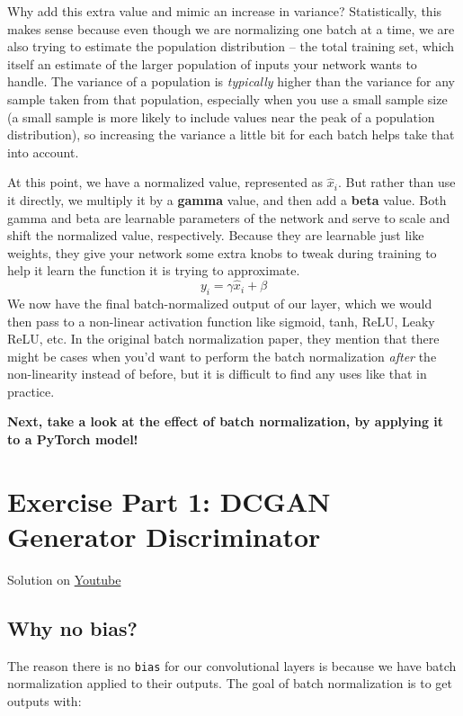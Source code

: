 Why add this extra value and mimic an increase in variance? Statistically, this makes sense because even though we are normalizing one batch at a time, we are also trying to estimate the population distribution – the total training set, which itself an estimate of the larger population of inputs your network wants to handle. The variance of a population is \textit{typically} higher than the variance for any sample taken from that population, especially when you use a small sample size (a small sample is more likely to include values near the peak of a population distribution), so increasing the variance a little bit for each batch helps take that into account. \newline

At this point, we have a normalized value, represented as \(\hat{x}_i\). But rather than use it directly, we multiply it by a \textbf{gamma} value, and then add a \textbf{beta} value. Both gamma and beta are learnable parameters of the network and serve to scale and shift the normalized value, respectively. Because they are learnable just like weights, they give your network some extra knobs to tweak during training to help it learn the function it is trying to approximate. \[y_i = \gamma \hat{x}_i + \beta\]
We now have the final batch-normalized output of our layer, which we would then pass to a non-linear activation function like sigmoid, tanh, ReLU, Leaky ReLU, etc. In the original batch normalization paper, they mention that there might be cases when you'd want to perform the batch normalization \textit{after} the non-linearity instead of before, but it is difficult to find any uses like that in practice. \newline

\textbf{Next, take a look at the effect of batch normalization, by applying it to a PyTorch model!}

\section{Exercise Part 1: DCGAN Generator Discriminator}


Solution on \href{https://www.youtube.com/watch?v=VSjGD3VtsZU}{Youtube}

\subsection{Why no bias?}

The reason there is no \verb|bias| for our convolutional layers is because we have batch normalization applied to their outputs. The goal of batch normalization is to get outputs with:

